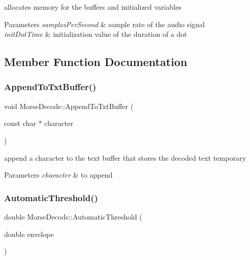 allocates memory for the buffers and initialized variables 


\begin{DoxyParams}{Parameters}
{\em samples\+Per\+Second} & sample rate of the audio signal \\
\hline
{\em init\+Dot\+Time} & initialization value of the duration of a dot \\
\hline
\end{DoxyParams}


\subsection{Member Function Documentation}
\mbox{\label{classMorseDecode_a9e189d9682a7291f7fc86eb6b86d817d}} 
\subsubsection{\texorpdfstring{Append\+To\+Txt\+Buffer()}{AppendToTxtBuffer()}}
{\footnotesize\ttfamily void Morse\+Decode\+::\+Append\+To\+Txt\+Buffer (\begin{DoxyParamCaption}\item[{const char $\ast$}]{character }\end{DoxyParamCaption})\hspace{0.3cm}{\ttfamily [private]}}



append a character to the text buffer that stores the decoded text temporary 


\begin{DoxyParams}{Parameters}
{\em character} & to append \\
\hline
\end{DoxyParams}
\mbox{\label{classMorseDecode_af21aeb2136d254ee6fb0139c25dd5d9a}} 
\subsubsection{\texorpdfstring{Automatic\+Threshold()}{AutomaticThreshold()}}
{\footnotesize\ttfamily double Morse\+Decode\+::\+Automatic\+Threshold (\begin{DoxyParamCaption}\item[{double}]{envelope }\end{DoxyParamCaption})\hspace{0.3cm}{\ttfamily [private]}}



